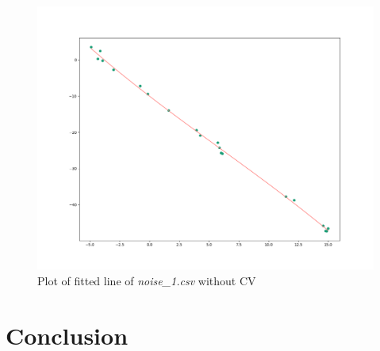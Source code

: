 \documentclass[a4paper,11pt]{article}
\begin{document}
\FloatBarrier

\begin{figure}[ht!]
    \centering
    \caption{Plot of fitted line of \textit{noise\_1.csv} without CV}
    \label{fig:noise1NoCV}
    \includegraphics[width=0.5\linewidth]{res/noise_1_no_cv.png}
\end{figure}



\section{Conclusion}
\end{document}
